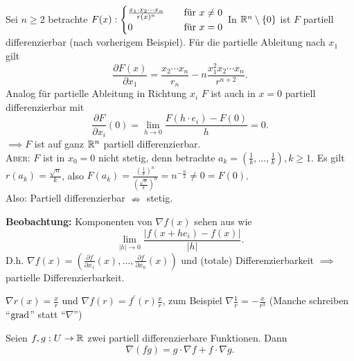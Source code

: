 \begin{example}
	Sei $ n \geq 2 $ betrachte $ F(x) : \begin{cases}
		\frac{ x_1 \cdot x_2 \dotsb x_n }{ r(x)^n } & \quad \text{für $ x \neq 0 $} \\
		0 & \quad \text{für $ x = 0 $} 
	\end{cases} $ 
	In $ \mathbb{R} ^n \setminus \left\{ 0 \right\}  $ ist $ F $ partiell differenzierbar (nach vorherigem Beispiel).
	Für die partielle Ableitung nach $ x_1 $ gilt
	\[
		\frac{\partial F(x)}{ \partial x_1 } = \frac{ x_2 \dotsb x_n }{ r_n } - n \frac{ x_1^2 x_2 \dotsb x_n }{ r^{n + 2}  } .
	\]
	Analog für partielle Ableitung in Richtung $ x_i $
	$ F $ ist auch in $ x = 0 $ partiell differenzierbar mit
	\[
		\frac{ \partial F}{ \partial x_i } (0) = \lim_{h \to 0} \frac{ F(h \cdot e_i ) - F(0) }{ h } = 0.
	\]
	$ \implies F $ ist auf ganz $ \mathbb{R} ^n $ partiell differenzierbar.\\
	\textsc{Aber:} $ F $ ist in $ x_0 = 0 $ nicht stetig, denn betrachte $ a_k = \left( \frac{ 1 }{ k } , \dotsc, \frac{ 1 }{ k }  \right) , k \geq 1 $.
	Es gilt $ r (a_k) = \frac{ \sqrt{n} }{ k }  $, also $ F(a_k) = \frac{ \left( \frac{ 1 }{ k }  \right) ^n }{ \left( \frac{\sqrt{n}}{ k }  \right) ^n } = n^{- \frac{n}{ 2 } } \neq 0 = F(0) $.\\
	{\color{gadse-red}Also: Partiell differenzierbar $ \nRightarrow  $ stetig.}
\end{example}

\textbf{Beobachtung:} Komponenten von $ \nabla f(x) $ sehen aus wie
\[
	\lim_{\left| h \right|  \to 0} \frac{ \left| f(x + h e_i ) - f(x) \right| }{ \left| h \right|  } .
\]
D.h. $ \nabla f(x) = \left( \frac{ \partial f }{ \partial x_1 } (x) , \dotsc, \frac{\partial f}{ \partial x_n } (x) \right)  $ und (totale) Differenzierbarkeit $ \implies  $ partielle Differenzierbarkeit.

\begin{example}
	$ \nabla r(x) = \frac{ x }{ r }  $ und $ \nabla f(r) = f^\prime (r) \frac{ x }{ r }  $, zum Beispiel $ \nabla  \frac{ 1 }{ r } = - \frac{ x }{ r^3 }  $ 
	(Manche schreiben ``$ \operatorname{grad} $'' statt ``$ \nabla  $'')
\end{example}

\begin{example}
	Seien $ f, g : U \to \mathbb{R}  $ zwei partiell differenzierbare Funktionen. Dann
	\[
		\nabla (fg) = g \cdot \nabla f + f \cdot \nabla g.
	\]
\end{example}

